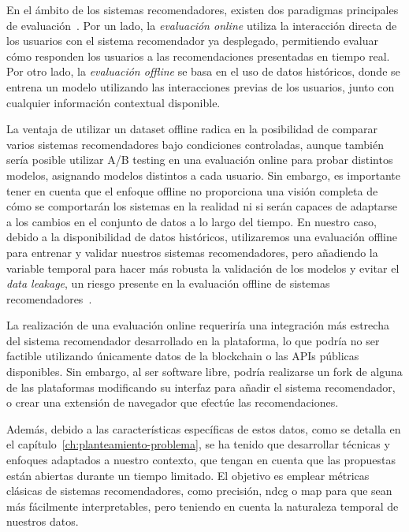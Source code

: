 En el ámbito de los sistemas recomendadores, existen dos paradigmas principales de evaluación~\cite{aggarwal_recommender_2016}. Por un lado, la \textit{evaluación online} utiliza la interacción directa de los usuarios con el sistema recomendador ya desplegado, permitiendo evaluar cómo responden los usuarios a las recomendaciones presentadas en tiempo real. Por otro lado, la \textit{evaluación offline} se basa en el uso de datos históricos, donde se entrena un modelo utilizando las interacciones previas de los usuarios, junto con cualquier información contextual disponible.

La ventaja de utilizar un dataset offline radica en la posibilidad de comparar varios sistemas recomendadores bajo condiciones controladas, aunque también sería posible utilizar A/B testing en una evaluación online para probar distintos modelos, asignando modelos distintos a cada usuario. Sin embargo, es importante tener en cuenta que el enfoque offline no proporciona una visión completa de cómo se comportarán los sistemas en la realidad ni si serán capaces de adaptarse a los cambios en el conjunto de datos a lo largo del tiempo. En nuestro caso, debido a la disponibilidad de datos históricos, utilizaremos una evaluación offline para entrenar y validar nuestros sistemas recomendadores, pero añadiendo la variable temporal para hacer más robusta la validación de los modelos y evitar el \textit{data leakage}, un riesgo presente en la evaluación offline de sistemas recomendadores~\cite{ji_critical_2023}.

La realización de una evaluación online requeriría una integración más estrecha del sistema recomendador desarrollado en la plataforma, lo que podría no ser factible utilizando únicamente datos de la blockchain o las APIs públicas disponibles. Sin embargo, al ser software libre, podría realizarse un fork de alguna de las plataformas modificando su interfaz para añadir el sistema recomendador, o crear una extensión de navegador que efectúe las recomendaciones.

Además, debido a las características específicas de estos datos, como se detalla en el capítulo~\ref{ch:planteamiento-problema}, se ha tenido que desarrollar técnicas y enfoques adaptados a nuestro contexto, que tengan en cuenta que las propuestas están abiertas durante un tiempo limitado. El objetivo es emplear métricas clásicas de sistemas recomendadores, como precisión, \acrshort{ndcg} o \acrshort{map} para que sean más fácilmente interpretables, pero teniendo en cuenta la naturaleza temporal de nuestros datos.

